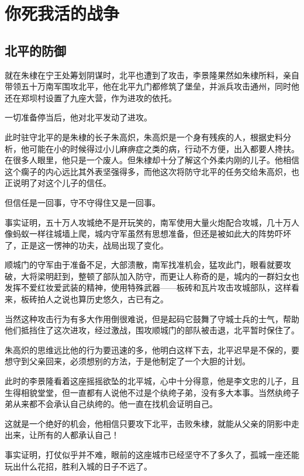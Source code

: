 \section{你死我活的战争}
\ifnum{}
	\begin{multicols}{\theparacolNo}
		\fi
		\subsection{北平的防御}
		就在朱棣在宁王处筹划阴谋时，北平也遭到了攻击，李景隆果然如朱棣所料，亲自带领五十万南军围攻北平，他在北平九门都修筑了堡垒，并派兵攻击通州，同时他还在郑坝村设置了九座大营，作为进攻的依托。

		一切准备停当后，他对北平发动了进攻。

		此时驻守北平的是朱棣的长子朱高炽，朱高炽是一个身有残疾的人，根据史料分析，他可能在小的时候得过小儿麻痹症之类的病，行动不方便，出入都要人搀扶。在很多人眼里，他只是一个废人。但朱棣却十分了解这个外柔内刚的儿子。他相信这个瘸子的内心远比其外表坚强得多，而他这次将防守北平的任务交给朱高炽，也正说明了对这个儿子的信任。

		但信任是一回事，守不守得住又是一回事。

		事实证明，五十万人攻城绝不是开玩笑的，南军使用大量火炮配合攻城，几十万人像蚂蚁一样往城墙上爬，城内守军虽然有思想准备，但还是被如此大的阵势吓坏了，正是这一愣神的功夫，战局出现了变化。

		顺城门的守军由于准备不足，大部溃散，南军找准机会，猛攻此门，眼看就要攻破，大将梁明赶到，整顿了部队加入防守，而更让人称奇的是，城内的一群妇女也发挥不爱红妆爱武装的精神，使用特殊武器——板砖和瓦片攻击攻城部队，这样看来，板砖拍人之说也算历史悠久，古已有之。

		当然这种攻击行为有多大作用倒很难说，但是起码它鼓舞了守城士兵的士气，帮助他们抵挡住了这次进攻，经过激战，围攻顺城门的部队被击退，北平暂时保住了。

		朱高炽的思维远比他的行为要迅速的多，他明白这样下去，北平迟早是不保的，要想守到父亲回来，必须想别的方法，于是他制定了一个大胆的计划。

		此时的李景隆看着这座摇摇欲坠的北平城，心中十分得意，他是李文忠的儿子，且生得相貌堂堂，但一直都有人说他不过是个纨绔子弟，没有多大本事。当然纨绔子弟从来都不会承认自己纨绔的。他一直在找机会证明自己。

		这就是一个绝好的机会，他相信只要攻下北平，击败朱棣，就能从父亲的阴影中走出来，让所有的人都承认自己！

		事实证明，打仗似乎并不难，眼前的这座城市已经坚守不了多久了，孤城一座还能玩出什么花招，胜利入城的日子不远了。


\end{multicols}

